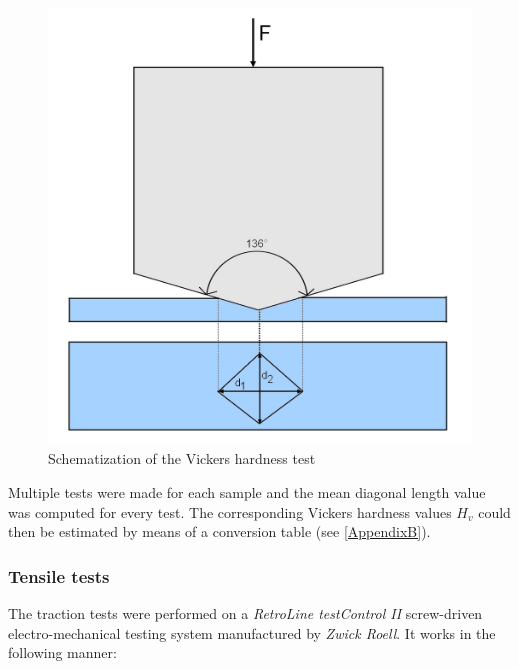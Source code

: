 \begin{figure}[ht]
\centering
\centerline{\includegraphics[scale=0.29]{Images/Vickers}}
\decoRule
\caption[Schematization of the Vickers hardness test]{Schematization of the Vickers hardness test}
\label{fig:Vick}
\end{figure}

Multiple tests were made for each sample and the mean diagonal length value was computed for every test. The corresponding Vickers hardness values $H_v$ could then be estimated by means of a conversion table (see \ref{AppendixB}).\\

\subsubsection{Tensile tests}

The traction tests were performed on a \textit{RetroLine testControl II} screw-driven electro-mechanical testing system manufactured by \textit{Zwick Roell}. It works in the following manner:


